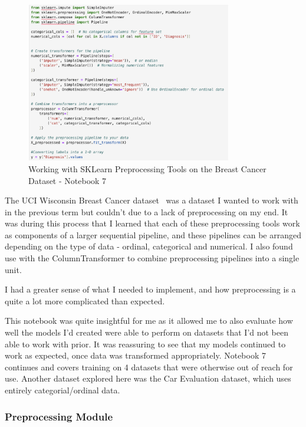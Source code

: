\documentclass[letterpaper,10pt]{article}
\begin{document}
\begin{figure}[ht]
    \centering
    \includegraphics[width=0.8\textwidth]{notebook_7_1.png}
    \caption{Working with SKLearn Preprocessing Tools on the Breast Cancer Dataset - Notebook 7}
    \label{fig:notebook_7_1}
\end{figure}

The UCI Wisconsin Breast Cancer dataset~\cite{breastcancerdataset_wisconsion} was a dataset I wanted to work with in the previous term but couldn't due to a lack of preprocessing on my end. It was during this process that I learned that each of these preprocessing tools work as components of a larger sequential pipeline, and these pipelines can be arranged depending on the type of data - ordinal, categorical and numerical. I also found use with the ColumnTransformer to combine preprocessing pipelines into a single unit. \par
I had a greater sense of what I needed to implement, and how preprocessing is a quite a lot more complicated than expected. \par
This notebook was quite insightful for me as it allowed me to also evaluate how well the models I'd created were able to perform on datasets that I'd not been able to work with prior. It was reassuring to see that my models continued to work as expected, once data was transformed appropriately. Notebook 7 continues and covers training on 4 datasets that were otherwise out of reach for use. Another dataset explored here was the Car Evaluation dataset, which uses entirely categorial/ordinal data.  \par

\subsubsection{Preprocessing Module}
\end{document}
